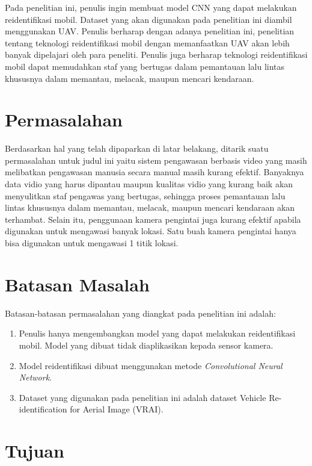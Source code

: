 Pada penelitian ini, penulis ingin membuat model CNN yang dapat melakukan reidentifikasi mobil. Dataset yang akan digunakan pada penelitian ini diambil menggunakan UAV. Penulis berharap dengan adanya penelitian ini, penelitian tentang teknologi reidentifikasi mobil dengan memanfaatkan UAV akan lebih banyak dipelajari oleh para peneliti. Penulis juga berharap teknologi reidentifikasi mobil dapat memudahkan staf yang bertugas dalam pemantauan lalu lintas khususnya dalam memantau, melacak, maupun mencari kendaraan.

\section{Permasalahan}
\label{sec:permasalahan}

Berdasarkan hal yang telah dipaparkan di latar belakang, ditarik suatu permasalahan untuk judul ini yaitu sistem pengawasan berbasis video yang masih melibatkan pengawasan manusia secara manual masih kurang efektif. Banyaknya data vidio yang harus dipantau maupun kualitas vidio yang kurang baik akan menyulitkan staf pengawas yang bertugas, sehingga proses pemantauan lalu lintas khususnya dalam memantau, melacak, maupun mencari kendaraan akan terhambat. Selain itu, penggunaan kamera pengintai juga kurang efektif apabila digunakan untuk mengawasi banyak lokasi. Satu buah kamera pengintai hanya bisa digunakan untuk mengawasi 1 titik lokasi.

\section{Batasan Masalah}
\label{sec:batasanmasalah}

Batasan-batasan permasalahan yang diangkat pada penelitian ini adalah:
\begin{enumerate}[nolistsep]
    \item Penulis hanya mengembangkan model yang dapat melakukan reidentifikasi mobil. Model yang dibuat tidak diaplikasikan kepada sensor kamera.
    \item Model reidentifikasi dibuat menggunakan metode \emph{Convolutional Neural Network}.
    \item Dataset yang digunakan pada penelitian ini adalah dataset Vehicle Re-identification for Aerial Image (VRAI).
\end{enumerate}

\section{Tujuan}
\label{sec:Tujuan}


